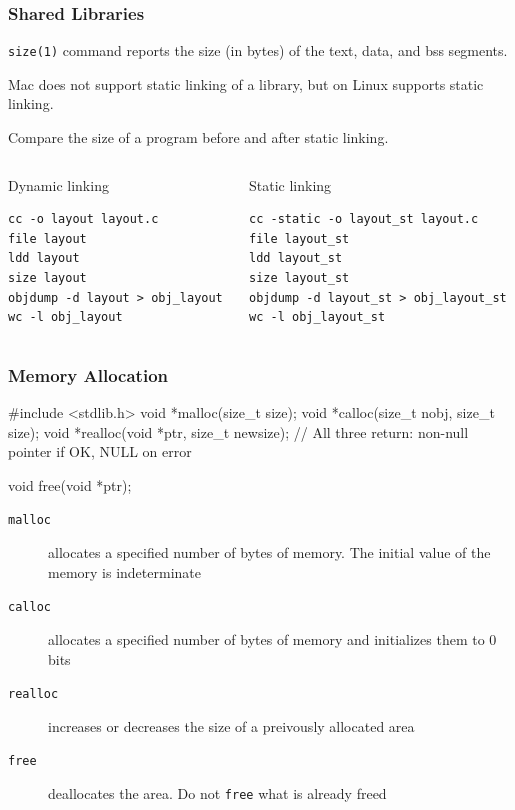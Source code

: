 \documentclass[newPxFont,sthlmFooter,nooffset]{beamer}
\begin{document}
\begin{frame}[containsverbatim,t]
  \frametitle{Shared Libraries}
\texttt{size(1)} command reports the size (in bytes) of the text, data, and bss segments.

Mac does not support static linking of a library, but on Linux supports static linking.

Compare the size of a program before and after static linking.
\bigskip
{\footnotesize
\begin{columns}
  \begin{column}{0.4\linewidth}
    Dynamic linking
\begin{verbatim}
cc -o layout layout.c
file layout
ldd layout
size layout
objdump -d layout > obj_layout
wc -l obj_layout
\end{verbatim}
  \end{column}
  \begin{column}{0.45\linewidth}
    Static linking
\begin{verbatim}
cc -static -o layout_st layout.c
file layout_st
ldd layout_st
size layout_st
objdump -d layout_st > obj_layout_st
wc -l obj_layout_st
\end{verbatim}
  \end{column}
\end{columns}
}
\end{frame}


\begin{frame}[containsverbatim,t]
  \frametitle{Memory Allocation}

\begin{codedef}
#include <stdlib.h>
void *malloc(size_t size);
void *calloc(size_t nobj, size_t size);
void *realloc(void *ptr, size_t newsize);
// All three return: non-null pointer if OK, NULL on error

void free(void *ptr);
\end{codedef}
\begin{description}
\item[\texttt{malloc}] allocates a specified number of bytes of memory. The initial value of the memory is indeterminate
\item[\texttt{calloc}] allocates a specified number of bytes of memory and initializes them to 0 bits
\item[\texttt{realloc}] increases or decreases the size of a preivously allocated area
\item[\texttt{free}] deallocates the area. Do not \texttt{free} what is already freed
\end{description}

\end{frame}
\end{document}
